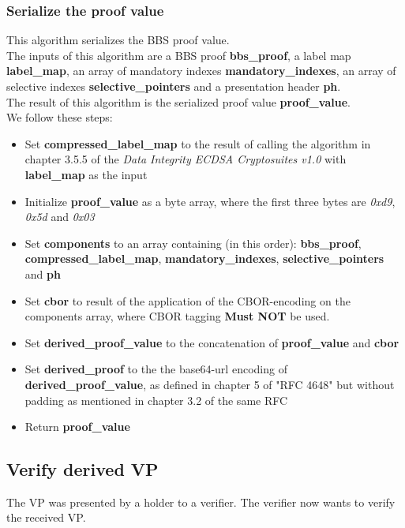 \documentclass[
	a4paper               %
	,BCOR=0mm            %
	,bibliography=totoc   %
	,listof=totoc         %
	,monolingual
	,twoside=false
]{bfhthesis}              %
\begin{document}
\subsubsection{Serialize the proof value}
\label{subsub:serializebaseproof}
This algorithm serializes the BBS proof value.\\

The inputs of this algorithm are a BBS proof \textbf{bbs\_proof}, a label map \textbf{label\_map}, an array of mandatory indexes \textbf{mandatory\_indexes}, an array of selective indexes \textbf{selective\_pointers} and a presentation header \textbf{ph}.\\

The result of this algorithm is the serialized proof value \textbf{proof\_value}.\\

We follow these steps:
\begin{itemize}
	\item Set \textbf{compressed\_label\_map} to the result of calling the algorithm in chapter 3.5.5 of the \textit{Data Integrity ECDSA Cryptosuites v1.0}\cite{ecdsa} with \textbf{label\_map} as the input
	\item Initialize \textbf{proof\_value} as a byte array, where the first three bytes are \textit{0xd9}, \textit{0x5d} and \textit{0x03}
	\item Set \textbf{components} to an array containing (in this order): \textbf{bbs\_proof}, \\\textbf{compressed\_label\_map}, \textbf{mandatory\_indexes}, \textbf{selective\_pointers} and \textbf{ph}
	\item Set \textbf{cbor} to result of the application of the CBOR-encoding\cite{cbor} on the components array, where CBOR tagging \textbf{Must NOT} be used.
	\item Set \textbf{derived\_proof\_value} to the concatenation of \textbf{proof\_value} and \textbf{cbor}
	\item Set \textbf{derived\_proof} to the the base64-url encoding of \textbf{derived\_proof\_value}, as defined in chapter 5 of "RFC 4648"\cite{base64} but without padding as mentioned in chapter 3.2 of the same RFC
	\item Return \textbf{proof\_value}
\end{itemize}

\subsection{Verify derived VP}
\label{subsub:verifyvp}
The VP was presented by a holder to a verifier. 
The verifier now wants to verify the received VP.\\
\end{document}
